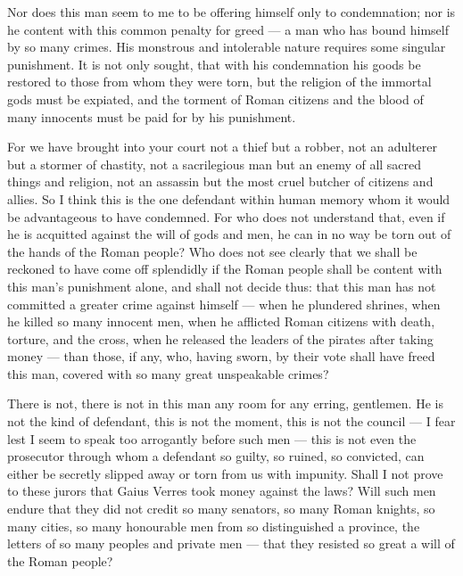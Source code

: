  Nor does this man seem to me to be offering himself only to condemnation; nor is he content with this common penalty for greed --- a man who has bound himself by so many crimes. His monstrous and intolerable nature requires some singular punishment. It is not only sought, that with his condemnation his goods be restored to those from whom they were torn, but the religion of the immortal gods must be expiated, and the torment of Roman citizens and the blood of many innocents must be paid for by his punishment.

 For we have brought into your court not a thief but a robber, not an adulterer but a stormer of chastity, not a sacrilegious man but an enemy of all sacred things and religion, not an assassin but the most cruel butcher of citizens and allies. So I think this is the one defendant within human memory whom it would be advantageous to have condemned. For who does not understand that, even if he is acquitted against the will of gods and men, he can in no way be torn out of the hands of the Roman people? Who does not see clearly that we shall be reckoned to have come off splendidly if the Roman people shall be content with this man's punishment alone, and shall not decide thus: that this man has not committed a greater crime against himself --- when he plundered shrines, when he killed so many innocent men, when he afflicted Roman citizens with death, torture, and the cross, when he released the leaders of the pirates after taking money --- than those, if any, who, having sworn, by their vote shall have freed this man, covered with so many great unspeakable crimes?

 There is not, there is not in this man any room for any erring, gentlemen. He is not the kind of defendant, this is not the moment, this is not the council --- I fear lest I seem to speak too arrogantly before such men --- this is not even the prosecutor through whom a defendant so guilty, so ruined, so convicted, can either be secretly slipped away or torn from us with impunity. Shall I not prove to these jurors that Gaius Verres took money against the laws? Will such men endure that they did not credit so many senators, so many Roman knights, so many cities, so many honourable men from so distinguished a province, the letters of so many peoples and private men --- that they resisted so great a will of the Roman people?

